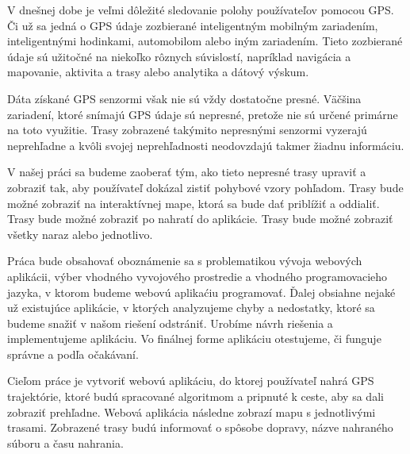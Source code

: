 V dnešnej dobe je veľmi dôležité sledovanie polohy používateľov pomocou GPS. Či už sa jedná o GPS údaje zozbierané inteligentným mobilným zariadením, inteligentnými hodinkami, automobilom alebo iným zariadením. Tieto zozbierané údaje sú užitočné na niekoľko rôznych súvislostí, napríklad navigácia a mapovanie, aktivita a trasy alebo analytika a dátový výskum. 


Dáta získané GPS senzormi však nie sú vždy dostatočne presné. Väčšina zariadení, ktoré snímajú GPS údaje sú nepresné, pretože nie sú určené primárne na toto využitie. Trasy zobrazené takýmito nepresnými senzormi vyzerajú neprehľadne a kvôli svojej neprehľadnosti neodovzdajú takmer žiadnu informáciu.

V našej práci sa budeme zaoberať tým, ako tieto nepresné trasy upraviť a zobraziť tak, aby používateľ dokázal zistiť pohybové vzory pohľadom. Trasy bude možné zobraziť na interaktívnej mape, ktorá sa bude dať priblížiť a oddialiť. Trasy bude možné zobraziť po nahratí do aplikácie. Trasy bude možné zobraziť všetky naraz alebo jednotlivo.

Práca bude obsahovať oboznámenie sa s problematikou vývoja webových aplikácii, výber vhodného vyvojového prostredie a vhodného programovacieho jazyka, v ktorom budeme webovú aplikaćiu programovať. Ďalej obsiahne nejaké už existujúce aplikácie, v ktorých analyzujeme chyby a nedostatky, ktoré sa budeme snažiť v našom riešení odstrániť. Urobíme návrh riešenia a implementujeme aplikáciu. Vo finálnej forme aplikáciu otestujeme, či funguje správne a podľa očakávaní.

Cieľom práce je vytvoriť webovú aplikáciu, do ktorej používateľ nahrá GPS trajektórie, ktoré budú spracované algoritmom a pripnuté k ceste, aby sa dali zobraziť prehľadne. Webová aplikácia následne zobrazí mapu s jednotlivými trasami. Zobrazené trasy budú informovať o spôsobe dopravy, názve nahraného súboru a času nahrania.
